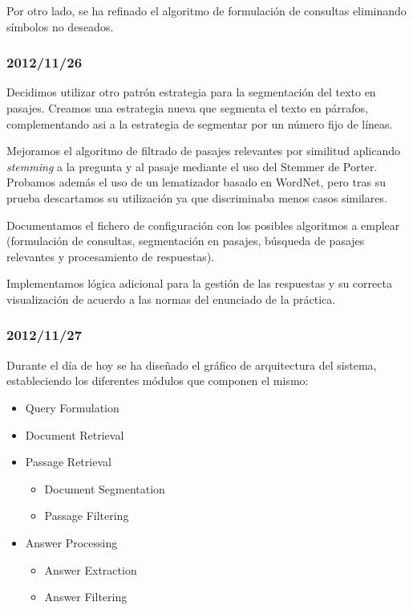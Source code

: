 \documentclass[12pt,a4paper,titlepage]{article}
\begin{document}
Por otro lado, se ha refinado el algoritmo de formulación de consultas eliminando símbolos no deseados.

\subsubsection*{2012/11/26}
Decidimos utilizar otro patrón estrategia para la segmentación del texto en pasajes. Creamos una estrategia nueva que segmenta el texto en párrafos, complementando asi a la estrategia de segmentar por un número fijo de líneas.

Mejoramos el algoritmo de filtrado de pasajes relevantes por similitud aplicando \emph{stemming} a la pregunta y al pasaje mediante el uso del Stemmer de Porter. Probamos además el uso de un lematizador basado en WordNet, pero tras su prueba descartamos su utilización ya que discriminaba menos casos similares.

Documentamos el fichero de configuración con los posibles algoritmos a emplear (formulación de consultas, segmentación en pasajes, búsqueda de pasajes relevantes y procesamiento de respuestas).

Implementamos lógica adicional para la gestión de las respuestas y su correcta visualización de acuerdo a las normas del enunciado de la práctica.

\subsubsection*{2012/11/27}
Durante el día de hoy se ha diseñado el gráfico de arquitectura del sistema, estableciendo los diferentes módulos que componen el mismo:

\begin{itemize}
\item Query Formulation 
\item Document Retrieval
\item Passage Retrieval
	\begin{itemize}
	\item Document Segmentation
	\item Passage Filtering 
	\end{itemize}
\item Answer Processing
	\begin{itemize}
	\item Answer Extraction
	\item Answer Filtering
	\end{itemize}
\end{itemize}
\end{document}
